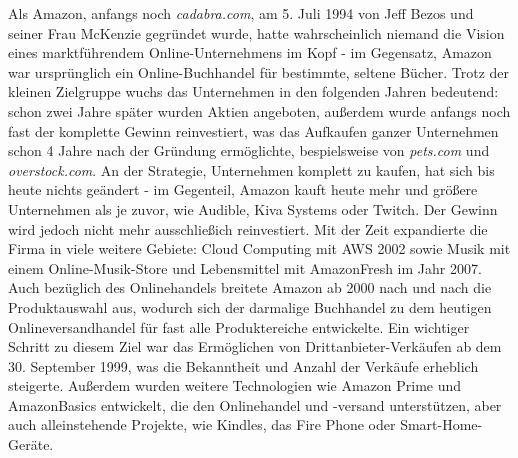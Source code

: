 Als Amazon, anfangs noch \emph{cadabra.com}, am 5. Juli 1994 von Jeff Bezos und seiner Frau McKenzie gegründet wurde, hatte wahrscheinlich niemand die Vision eines marktführendem Online-Unternehmens im Kopf - im Gegensatz, Amazon war ursprünglich ein Online-Buchhandel für bestimmte, seltene Bücher\cite[S. 17]{Graf}. Trotz der kleinen Zielgruppe wuchs das Unternehmen in den folgenden Jahren bedeutend: schon zwei Jahre später wurden Aktien angeboten, außerdem wurde anfangs noch fast der komplette Gewinn reinvestiert\cite{Rosoff}, was das Aufkaufen ganzer Unternehmen schon 4 Jahre nach der Gründung ermöglichte, bespielsweise von \emph{pets.com} und \emph{overstock.com}\cite{ChannelAdvisor}. An der Strategie, Unternehmen komplett zu kaufen, hat sich bis heute nichts geändert - im Gegenteil, Amazon kauft heute mehr und größere Unternehmen als je zuvor\cite[S. 27]{Haendlerbund}, wie Audible, Kiva Systems oder Twitch\cite{Sherman}. Der Gewinn wird jedoch nicht mehr ausschließich reinvestiert\cite{Rosoff}. Mit der Zeit expandierte die Firma in viele weitere Gebiete: Cloud Computing mit \ac{AWS} 2002 sowie Musik mit einem Online-Musik-Store und Lebensmittel mit AmazonFresh im Jahr 2007\cite{Sherman, ChannelAdvisor}. Auch bezüglich des Onlinehandels breitete Amazon ab 2000 nach und nach die Produktauswahl aus, wodurch sich der darmalige Buchhandel zu dem heutigen Onlineversandhandel für fast alle Produktereiche entwickelte. Ein wichtiger Schritt zu diesem Ziel war das Ermöglichen von Drittanbieter-Verkäufen ab dem 30. September 1999, was die Bekanntheit und Anzahl der Verkäufe erheblich steigerte\cite{Sherman}. Außerdem wurden weitere Technologien wie Amazon Prime und AmazonBasics entwickelt, die den Onlinehandel und -versand unterstützen\cite{ChannelAdvisor}, aber auch alleinstehende Projekte, wie Kindles, das Fire Phone oder Smart-Home-Geräte\cite{Sherman}.

